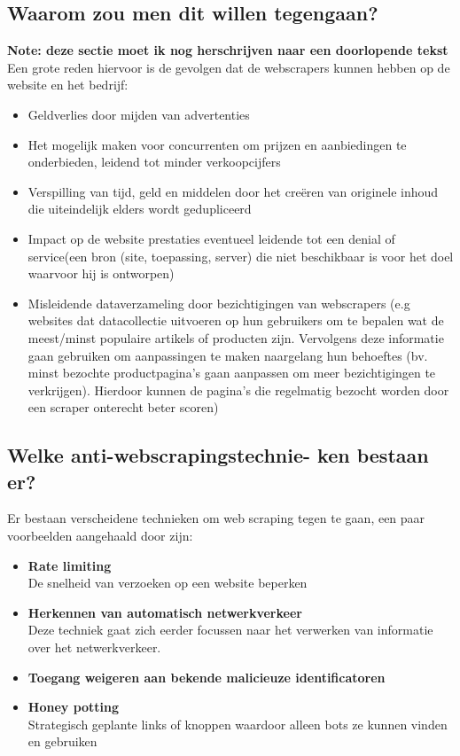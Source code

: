 \subsection{Waarom zou men dit willen tegengaan?}
\textbf{Note: deze sectie moet ik nog herschrijven naar een doorlopende tekst}
Een grote reden hiervoor is de gevolgen dat de webscrapers kunnen hebben op de website en het bedrijf: 
\begin{itemize}
    \item Geldverlies door mijden van advertenties \newline \autocite{Krotov2020}
    \item Het mogelijk maken voor concurrenten om prijzen en aanbiedingen te onderbieden, leidend tot minder verkoopcijfers
    \item Verspilling van tijd, geld en middelen door het creëren van originele inhoud die uiteindelijk elders wordt gedupliceerd
    \item Impact op de website prestaties eventueel leidende tot een denial of service(een bron (site, toepassing, server) die niet beschikbaar is voor het doel waarvoor hij is ontworpen)
    \item Misleidende dataverzameling door bezichtigingen van webscrapers (e.g websites dat datacollectie uitvoeren op hun gebruikers om te bepalen wat de meest/minst populaire artikels of producten zijn. Vervolgens  deze informatie gaan gebruiken om aanpassingen te maken naargelang hun behoeftes (bv. minst bezochte productpagina's gaan aanpassen om meer bezichtigingen te verkrijgen). Hierdoor kunnen de pagina's die regelmatig bezocht worden door een scraper onterecht beter scoren)
\end{itemize}

\subsection{Welke anti-webscrapingstechnie- ken bestaan er?}
Er bestaan verscheidene technieken om web scraping tegen te gaan, een paar voorbeelden aangehaald door \autocite{10.1007/978-3-030-90016-8_4} zijn:
\begin{itemize}
    \item \textbf{Rate limiting}
    \\
    De snelheid van verzoeken op een website beperken
    \item \textbf{Herkennen van automatisch netwerkverkeer}
    \\
    Deze techniek gaat zich eerder focussen naar het verwerken van informatie over het netwerkverkeer.
    \item \textbf{Toegang weigeren aan bekende malicieuze identificatoren}
    \\
    \item \textbf{Honey potting}
    \\
    Strategisch geplante links of knoppen waardoor alleen bots ze kunnen vinden en gebruiken
\end{itemize}

